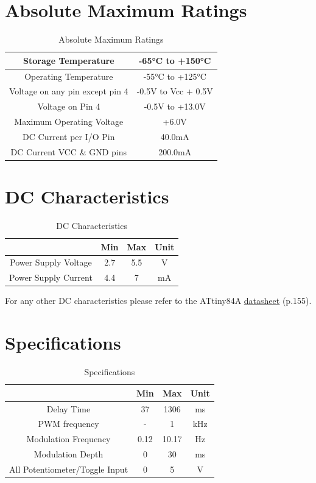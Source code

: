 \documentclass[a4paper, 10pt]{article}
\begin{document}
\section{Absolute Maximum Ratings}
\bigbreak
\begin{table}[h!]
\centering
\begin{tabular}{|c|c|}
\hline
Storage Temperature	& -65°C to +150°C\\
\hline
Operating Temperature & -55°C to +125°C\\
\hline
Voltage on any pin except pin 4	& -0.5V to Vcc + 0.5V\\
\hline
Voltage on Pin 4 & -0.5V to +13.0V\\
\hline
Maximum Operating Voltage & +6.0V\\
\hline
DC Current per I/O Pin & 40.0mA\\
\hline
DC Current VCC \& GND pins & 200.0mA\\
\hline
\end{tabular}
\caption{Absolute Maximum Ratings}
\end{table}
\bigbreak
\bigbreak
\section{DC Characteristics}
\bigbreak
\begin{table}[h!]
\centering
\begin{tabular}{|c|c|c|c|}
\hline
\rowcolor{lightgray}{\Large\textbf{Parameter}} & {\Large\textbf{Min}} & {\Large\textbf{Max}} & {\Large\textbf{Unit}}\\
\hline
Power Supply Voltage & 2.7 & 5.5 & V\\
\hline
Power Supply Current & 4.4 & 7 & mA\\
\hline
\end{tabular}
\caption{DC Characteristics}
\end{table}
\bigbreak
For any other DC characteristics please refer to the ATtiny84A \href{http://ww1.microchip.com/downloads/en/devicedoc/Atmel-7701_Automotive-Microcontrollers-ATtiny24-44-84_Datasheet.pdf}{\underline{datasheet}} (p.155).
\bigbreak
\bigbreak
\section{Specifications}

\begin{table}[h!]
\centering
\begin{tabular}{|c|c|c|c|}
\hline
\rowcolor{lightgray}{\Large\textbf{Parameter}} & {\Large\textbf{Min}} & {\Large\textbf{Max}} & {\Large\textbf{Unit}}\\
\hline
Delay Time & 37 & 1306 & ms\\
\hline
PWM frequency & - & 1 & kHz\\
\hline
Modulation Frequency & 0.12 & 10.17 & Hz\\
\hline
Modulation Depth & 0 & 30 & ms\\
\hline
All Potentiometer/Toggle Input & 0 & 5 & V\\
\hline
\end{tabular}
\caption{Specifications}
\end{table}
\end{document}
